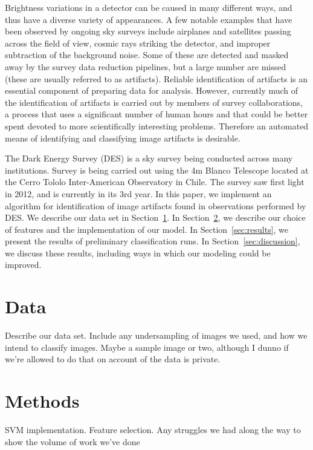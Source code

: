 \documentclass[iop,apj]{emulateapj}
\begin{document}
Brightness variations in a detector can be caused in many different ways, and thus have a 
diverse variety of appearances.  A few notable 
examples that have been observed by ongoing sky surveys include airplanes and satellites
passing across the field of view, cosmic rays striking the detector, and improper subtraction of 
the background noise.  Some of these are detected and masked away by the survey 
data reduction pipelines, but a large number are missed (these are usually referred to as
artifacts).  Reliable identification of artifacts is an essential component of preparing data for
analysis.  However, currently much of the identification of artifacts is carried out by members 
of survey collaborations, a process that uses a significant number of human hours and that 
could be better spent devoted to more scientifically interesting problems.  Therefore an 
automated means of identifying and classifying image artifacts is desirable.  

The Dark Energy Survey (DES) is a sky survey being conducted across many institutions.
Survey is being carried out using the 4m Blanco Telescope located at the Cerro Tololo Inter-American
Observatory in Chile.  The survey saw first light in 2012, and is currently in its 3rd year.  
In this paper, we implement an algorithm for identification of image artifacts found in observations
performed by DES.  We describe our data set in Section~\ref{sec:data}.  In Section~\ref{sec:methods}, we
describe our choice of features and the implementation of our model.  In Section~\ref{sec:results}, we 
present the results of preliminary classification runs.  In Section~\ref{sec:discussion}, we discuss these results, 
including ways in which our modeling could be improved.

\section{Data} \label{sec:data}

{\color{red}  Describe our data set.  Include any undersampling of images we used, and how we intend to
classify images.  Maybe a sample image or two, although I dunno if we're allowed to do that on account of the data is private.}

\section{Methods} \label{sec:methods}

{\color{red} SVM implementation.  Feature selection.  Any struggles we had along the way to show the volume of work we've done}
\end{document}
